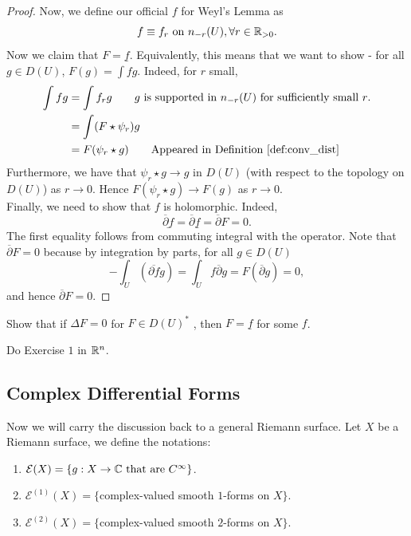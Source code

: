 \documentclass{article}
\begin{document}
{\begin{proof}
    Now, we define our official $f$ for Weyl's Lemma as
    \[f \equiv f_r \text{ on } n_{-r}(U), \forall r \in \mathbb{R}_{> 0}.\]
    Now we claim that $F = \underline{f}$. Equivalently, this means that we want to show - for all $g \in D(U)$, $F(g) = \int fg$. Indeed, for $r$ small,
    \begin{align*}
        \int fg &= \int f_r g \tag*{$g$ is supported in $n_{-r}(U)$ for sufficiently small $r$.}\\
        &= \int (F \star \psi_r) g\\
        &= F(\psi_r \star g) \tag*{Appeared in Definition~\ref{def:conv_dist}}
    \end{align*}
    Furthermore, we have that $\psi_r \star g \to g$ in $D(U)$ (with respect to the topology on $D(U)$) as $r \to 0$. Hence $F(\psi_r \star g) \to F(g)$ as $r \to 0$.\\

    Finally, we need to show that $f$ is holomorphic. Indeed, 
    \[\underline{\overline{\partial} f} = \overline{\partial} \underline{f} = \overline{\partial} F = 0.\]
    The first equality follows from commuting integral with the operator. Note that $\overline{\partial} F = 0$ because by integration by parts, for all $g \in D(U)$
    \[- \int_{U} (\overline{\partial f} g) = \int_{U} f \overline{\partial} g = F(\overline{\partial} g) = 0,\]
    and hence $\overline{\partial} F = 0$.
\end{proof}

\begin{exercise}
    Show that if $\Delta F = 0$ for $F \in D(U)^*$ , then $F = \underline{f}$ for some $f$.
\end{exercise}

\begin{exercise}
    Do Exercise $1$ in $\mathbb{R}^n$.
\end{exercise}

\subsection{Complex Differential Forms}

Now we will carry the discussion back to a general Riemann surface. Let $X$ be a Riemann surface, we define the notations:
\begin{enumerate}
    \item $\mathcal{E}(X) = \{g: X \to \mathbb{C} \text{ that are } C^\infty\}$.
    \item $\mathcal{E}^{(1)}(X) = \{$complex-valued smooth $1$-forms on $X\}$.
    \item $\mathcal{E}^{(2)}(X) = \{$complex-valued smooth $2$-forms on $X\}$.
\end{enumerate}

}
\end{document}
